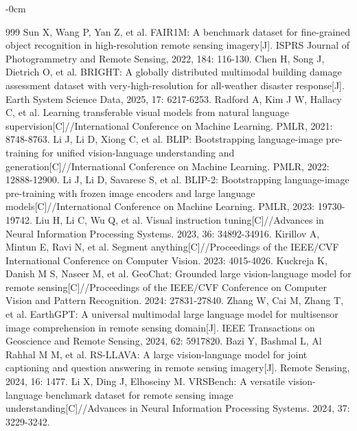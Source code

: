 \documentclass[applsci,article,accept,moreauthors]{Definitions/mdpi}
\begin{document}
\begin{adjustwidth}{-\extralength}{0cm}

\begin{thebibliography}{999}
Sun X, Wang P, Yan Z, et al. FAIR1M: A benchmark dataset for fine-grained object recognition in high-resolution remote sensing imagery[J]. ISPRS Journal of Photogrammetry and Remote Sensing, 2022, 184: 116-130.
Chen H, Song J, Dietrich O, et al. BRIGHT: A globally distributed multimodal building damage assessment dataset with very-high-resolution for all-weather disaster response[J]. Earth System Science Data, 2025, 17: 6217-6253.
Radford A, Kim J W, Hallacy C, et al. Learning transferable visual models from natural language supervision[C]//International Conference on Machine Learning. PMLR, 2021: 8748-8763.
Li J, Li D, Xiong C, et al. BLIP: Bootstrapping language-image pre-training for unified vision-language understanding and generation[C]//International Conference on Machine Learning. PMLR, 2022: 12888-12900.
Li J, Li D, Savarese S, et al. BLIP-2: Bootstrapping language-image pre-training with frozen image encoders and large language models[C]//International Conference on Machine Learning. PMLR, 2023: 19730-19742.
Liu H, Li C, Wu Q, et al. Visual instruction tuning[C]//Advances in Neural Information Processing Systems. 2023, 36: 34892-34916.
Kirillov A, Mintun E, Ravi N, et al. Segment anything[C]//Proceedings of the IEEE/CVF International Conference on Computer Vision. 2023: 4015-4026.
Kuckreja K, Danish M S, Naseer M, et al. GeoChat: Grounded large vision-language model for remote sensing[C]//Proceedings of the IEEE/CVF Conference on Computer Vision and Pattern Recognition. 2024: 27831-27840.
Zhang W, Cai M, Zhang T, et al. EarthGPT: A universal multimodal large language model for multisensor image comprehension in remote sensing domain[J]. IEEE Transactions on Geoscience and Remote Sensing, 2024, 62: 5917820.
Bazi Y, Bashmal L, Al Rahhal M M, et al. RS-LLAVA: A large vision-language model for joint captioning and question answering in remote sensing imagery[J]. Remote Sensing, 2024, 16: 1477.
Li X, Ding J, Elhoseiny M. VRSBench: A versatile vision-language benchmark dataset for remote sensing image understanding[C]//Advances in Neural Information Processing Systems. 2024, 37: 3229-3242.

\end{thebibliography}
\end{adjustwidth}
\end{document}
